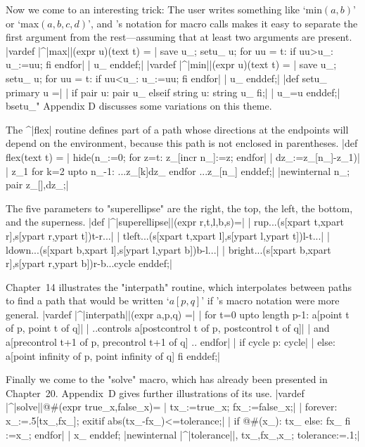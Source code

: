 Now we come to an interesting trick: The user writes something like
`min$(a,b)$' or `max$(a,b,c,d)$', and
\MF's notation for macro calls makes it easy to separate the first argument
from the rest---assuming that at least two arguments are present.
\beginlines
|vardef |^|max||(expr u)(text t) = %
| save u_; setu_ u; for uu = t: if uu>u_: u_:=uu; fi endfor|
| u_ enddef;|
\smallskip
|vardef |^|min||(expr u)(text t) = %
| save u_; setu_ u; for uu = t: if uu<u_: u_:=uu; fi endfor|
| u_ enddef;|
\smallskip
|def setu_ primary u =|
| if pair u: pair u_ elseif string u: string u_ fi;|
| u_=u enddef;|
\weakendlines
^^"setu\_" Appendix D discusses some variations on this theme.

The ^|flex| routine defines part of a path whose directions at the
endpoints will depend on the environment, because this path is not
enclosed in parentheses.
\beginlines
|def flex(text t) =           %
| hide(n_:=0; for z=t: z_[incr n_]:=z; endfor|
|  dz_:=z_[n_]-z_1)|
| z_1 for k=2 upto n_-1: ...z_[k]{dz_} endfor ...z_[n_] enddef;|
|newinternal n_; pair z_[],dz_;|
\endlines

The five parameters to "superellipse" are the right, the top, the left,
the bottom, and the superness.
\beginlines
|def |^|superellipse||(expr r,t,l,b,s)=|
| r{up}...(s[xpart t,xpart r],s[ypart r,ypart t]){t-r}...|
| t{left}...(s[xpart t,xpart l],s[ypart l,ypart t]){l-t}...|
| l{down}...(s[xpart b,xpart l],s[ypart l,ypart b]){b-l}...|
| b{right}...(s[xpart b,xpart r],s[ypart r,ypart b]){r-b}...cycle enddef;|
\endlines

Chapter~14 illustrates the "interpath" routine, which interpolates
between paths to find a path that would be written `$a[p,q]$' if
\MF's macro notation were more general.
\beginlines
|vardef |^|interpath||(expr a,p,q) =|
| for t=0 upto length p-1: a[point t of p, point t of q]|
|  ..controls a[postcontrol t of p, postcontrol t of q]|
|   and a[precontrol t+1 of p, precontrol t+1 of q] .. endfor|
| if cycle p: cycle|
| else: a[point infinity of p, point infinity of q] fi enddef;|
\endlines

Finally we come to the "solve" macro, which has already been presented
in Chapter~20. Appendix~D gives further illustrations of its use.
\beginlines
|vardef |^|solve||@#(expr true_x,false_x)= %
| tx_:=true_x; fx_:=false_x;|
| forever: x_:=.5[tx_,fx_]; exitif abs(tx_-fx_)<=tolerance;|
| if @#(x_): tx_ else: fx_ fi :=x_; endfor|
| x_ enddef; %
|newinternal |^|tolerance||, tx_,fx_,x_; tolerance:=.1;|
\finalendlines

